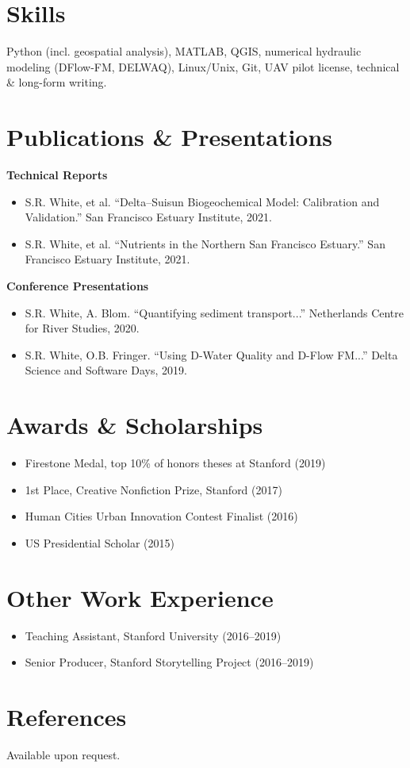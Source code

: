 \section*{Skills}
Python (incl. geospatial analysis), MATLAB, QGIS, numerical hydraulic modeling (DFlow-FM, DELWAQ), Linux/Unix, Git, UAV pilot license, technical \& long-form writing.

\section*{Publications \& Presentations}

\textbf{Technical Reports}
\begin{itemize}
  \item S.R. White, et al. ``Delta--Suisun Biogeochemical Model: Calibration and Validation.'' San Francisco Estuary Institute, 2021.
  \item S.R. White, et al. ``Nutrients in the Northern San Francisco Estuary.'' San Francisco Estuary Institute, 2021.
\end{itemize}

\textbf{Conference Presentations}
\begin{itemize}
  \item S.R. White, A. Blom. ``Quantifying sediment transport...'' Netherlands Centre for River Studies, 2020.
  \item S.R. White, O.B. Fringer. ``Using D-Water Quality and D-Flow FM...'' Delta Science and Software Days, 2019.
\end{itemize}

\section*{Awards \& Scholarships}
\begin{itemize}
  \item Firestone Medal, top 10\% of honors theses at Stanford (2019)
  \item 1st Place, Creative Nonfiction Prize, Stanford (2017)
  \item Human Cities Urban Innovation Contest Finalist (2016)
  \item US Presidential Scholar (2015)
\end{itemize}

\section*{Other Work Experience}
\begin{itemize}
  \item Teaching Assistant, Stanford University (2016--2019)
  \item Senior Producer, Stanford Storytelling Project (2016--2019)
\end{itemize}

\section*{References}
Available upon request.


